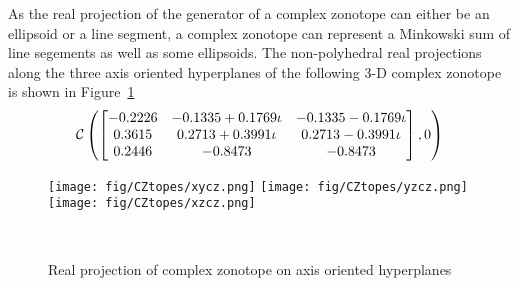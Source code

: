 As the real projection of the generator of a complex zonotope can
either be an ellipsoid or a line segment, a complex zonotope can
represent a Minkowski sum of line segements as well as some
ellipsoids.  The non-polyhedral real projections along the three axis
oriented hyperplanes of the following 3-D complex zonotope is shown in
Figure~\ref{fig:3dcztope}
%
\[
\mathit{\mathcal{C}}\left(\left[\begin{matrix}-0.2226  & -0.1335 + 0.1769\iota  & -0.1335 - 0.1769\iota\\
   0.3615 &   0.2713 + 0.3991\iota &  0.2713 - 0.3991\iota\\
   0.2446 &  -0.8473 &  -0.8473\end{matrix}\right],0\right)
\]
%
\begin{figure}
\center
\texttt{[image: fig/CZtopes/xycz.png]}
\texttt{[image: fig/CZtopes/yzcz.png]}
\texttt{[image: fig/CZtopes/xzcz.png]}
\caption{Real projection of complex zonotope on axis oriented hyperplanes}~\label{fig:3dcztope}
\end{figure}
%

